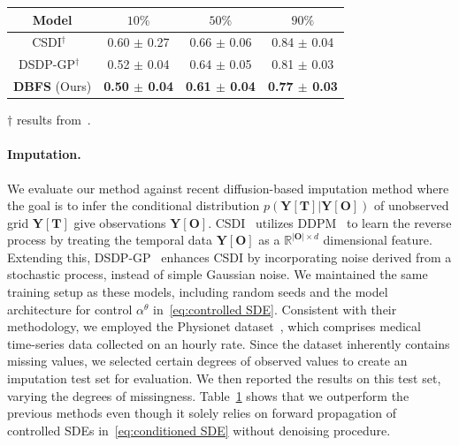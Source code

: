 \documentclass[nohyperref]{article}
\theoremstyle{plain}
\theoremstyle{remark}
\newcommand{\mb}{\mathbf}
\begin{document}
\begin{table}
\centering
\scriptsize
{}
    \begin{tabular}{c|c|c|c}
        \toprule
        Model & $10\%$ & $50\%$ & $90\%$  \\
        \midrule
        CSDI$^{\dag}$~\citep{CSDI} & 0.60 $\pm$ 0.27 & 0.66 $\pm$ 0.06& 0.84 $\pm$ 0.04 \\
        DSDP-GP$^{\dag}$~\citep{bilovs2023modeling} & 0.52 $\pm$ 0.04 & 0.64 $\pm$ 0.05 & 0.81 $\pm$ 0.03 \\
        \midrule
        \textbf{DBFS} (Ours) & \textbf{0.50 $\pm$ 0.04 }& \textbf{0.61 $\pm$ 0.04 }& \textbf{0.77 $\pm$ 0.03 }\\
        \bottomrule
    \end{tabular}
\begin{tablenotes}
\item $\dag$ results from~\citep{bilovs2023modeling}.
\end{tablenotes}\label{table:physionet}
\vspace{-6mm}
\end{table}
\paragraph{Imputation.} We evaluate our method against recent diffusion-based imputation method where the goal is to infer the conditional distribution $p(\mb{Y}[\mb{T}] | \mb{Y}[\mb{O}])$ of unobserved grid $\mb{Y}[\mb{T}]$ give observations $\mb{Y}[\mb{O}]$. CSDI~\citep{CSDI} utilizes DDPM~\citep{ho2020denoising} to learn the reverse process by treating the temporal data $\mb{Y}[\mb{O}]$ as a $\mathbb{R}^{|\mb{O}| \times d}$ dimensional feature. Extending this, DSDP-GP~\citep{bilovs2023modeling} enhances CSDI by incorporating noise derived from a stochastic process, instead of simple Gaussian noise. We maintained the same training setup as these models, including random seeds and the model architecture for control $\alpha^{\theta}$ in~\eqref{eq:controlled SDE}. Consistent with their methodology, we employed the Physionet dataset~\citep{Physionet}, which comprises medical time-series data collected on an hourly rate. Since the dataset inherently contains missing values, we selected certain degrees of observed values to create an imputation test set for evaluation. We then reported the results on this test set, varying the degrees of missingness. Table~\ref{table:physionet} shows that we outperform the previous methods even though it solely relies on forward propagation of controlled SDEs in~\eqref{eq:conditioned SDE} without denoising procedure.
\end{document}
